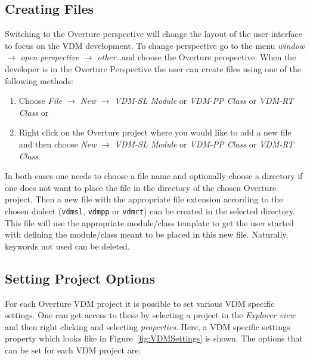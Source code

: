 \documentclass{overturerepsec}
\begin{document}

\subsection{Creating Files}

Switching to the Overture perspective will change the layout of the user
interface to focus on the VDM development. To change perspective go to the menu 
\emph{window} $\rightarrow$ \emph{open perspective} $\rightarrow$ \emph{other}\ldots and choose the
Overture perspective.
When the developer is in the Overture Perspective the user can create files
using one of the following methods:

\begin{enumerate}
  \item Choose \emph{File} $\rightarrow$ \emph{New} $\rightarrow$
    \emph{VDM-SL Module} or 
    \emph{VDM-PP Class} or 
    \emph{VDM-RT Class} or
  \item Right click on the Overture project where you would like to
    add a new file and then choose \emph{New} $\rightarrow$ 
    \emph{VDM-SL Module} or \emph{VDM-PP Class} or \emph{VDM-RT Class}.
\end{enumerate}

In both cases one needs to choose a file name and optionally choose a
directory if one does not want to place the file in the directory of
the chosen Overture project. Then a new file with the appropriate file
extension according to the chosen dialect (\texttt{vdmsl},
\texttt{vdmpp} or \texttt{vdmrt}) can be
created in the selected directory. This file will use the appropriate
module/class template to get the user started with defining the
module/class meant to be placed in this new file. Naturally, keywords 
not used can be deleted.

\subsection{Setting Project Options}\label{subsec:options}

For each Overture VDM project it is possible to set various VDM
specific settings. One can get access to these by selecting a project
in the \emph{Explorer view} and then right clicking and selecting
\emph{properties}. Here, a VDM specific settings property which
looks like in Figure~\ref{fig:VDMSettings} is shown. The options 
that can be set for each VDM project are:
\end{document}
